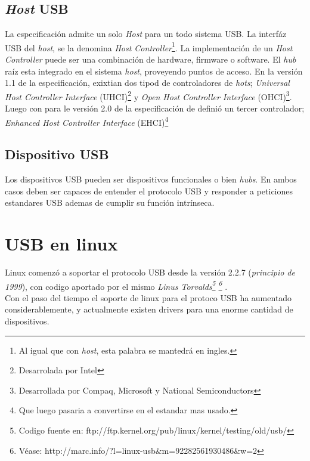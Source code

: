 \subsection{\emph{Host} USB}

La especificaci\'on admite un solo \emph{Host} para un todo sistema USB. La
interf\'az USB del \emph{host}, se la denomina \emph{Host
Controller}\footnote{Al igual que con \emph{host}, esta palabra se mantedr\'a
en ingles.}. La implementaci\'on de un \emph{Host Controller} puede ser una
combinaci\'on de hardware, firmware o software. El \emph{hub} ra\'iz esta
integrado en el sistema \emph{host}, proveyendo puntos de acceso.
En la versi\'on 1.1 de la especificaci\'on, exixtian dos tipod de
controladores de \emph{hots}; \emph{Universal Host Controller Interface}
(UHCI)\footnote{Desarrolada por Intel} y \emph{Open Host Controller Interface}
(OHCI)\footnote{Desarrollada por Compaq, Microsoft y National Semiconductors}.
Luego con para le versi\'on 2.0 de la especificaci\'on de defini\'o un tercer
controlador; \emph{Enhanced Host Controller Interface} (EHCI)\footnote{Que
luego pasaria a convertirse en el estandar mas usado.}

\subsection{Dispositivo USB}

Los dispositivos USB pueden ser dispositivos funcionales o bien \emph{hubs}.
En ambos casos deben ser capaces de entender el protocolo USB y responder a
peticiones estandares USB ademas de cumplir su funci\'on intr\'inseca. 



\section{USB en linux}

Linux comenz\'o a soportar el protocolo USB desde la versi\'on 2.2.7
(\emph{principio de 1999}), con codigo aportado por el mismo \emph{Linus
Torvalds\footnote{Codigo fuente
en: ftp://ftp.kernel.org/pub/linux/kernel/testing/old/usb/}
\footnote{V\'ease:
http://marc.info/?l=linux-usb\&m=92282561930486\&w=2}
}.\\

Con el paso del tiempo el soporte de linux para el protoco USB ha aumentado
considerablemente, y actualmente existen drivers para una enorme cantidad de
dispositivos.\\

